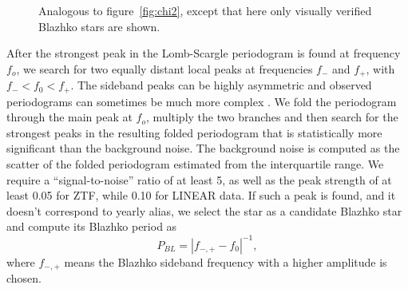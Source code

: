 \begin{figure}[ht]
  \caption{Analogous to figure~\ref{fig:chi2}, except that here only visually verified Blazhko stars are shown.}
  \label{fig:chi_final}
  \end{figure}

After the strongest peak in the Lomb-Scargle periodogram is found at frequency $f_o$, we search for  two equally
distant local peaks at frequencies $f_-$ and $f_+$, with $f_- < f_0 < f_+$.  The sideband peaks can be highly asymmetric
\cite{2003ApJ...598..597A} and observed periodograms can sometimes be much more complex \cite{2007MNRAS.377.1263S}.  
We fold the periodogram through the main peak at $f_o$, multiply the two branches and then search for the strongest peaks
in the resulting folded periodogram that is statistically more significant than the background noise. The background noise
is computed as the scatter of the folded periodogram estimated from the interquartile range. We require a ``signal-to-noise''
ratio of at least 5, as well as the peak strength of at least 0.05 for ZTF, while 0.10 for LINEAR data. 
If such a peak is found,
and it doesn't correspond to yearly alias, we select the star as a candidate Blazhko star and compute
its Blazhko period as 
\begin{equation*}
P_{BL} = |f_{-,+} - f_0|^{-1},
\end{equation*}
where $f_{-,+}$ means the Blazhko sideband frequency with a higher amplitude is chosen. 

